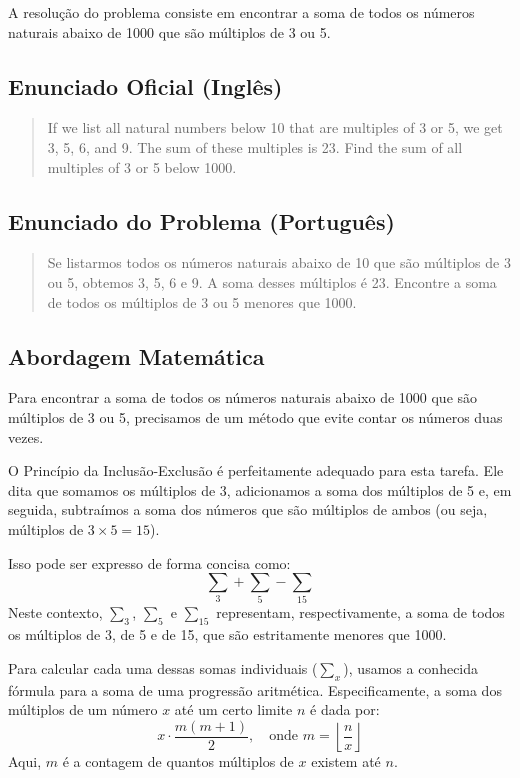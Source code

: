 
A resolução do problema consiste em encontrar a soma de todos os números naturais abaixo de 1000 que são múltiplos de 3 ou 5.

\subsection*{Enunciado Oficial (Inglês)}
\begin{quote}
If we list all natural numbers below 10 that are multiples of 3 or 5, we get 3, 5, 6, and 9. The sum of these multiples is 23.
Find the sum of all multiples of 3 or 5 below 1000.
\end{quote}

\subsection*{Enunciado do Problema (Português)}
\begin{quote}
Se listarmos todos os números naturais abaixo de 10 que são múltiplos de 3 ou 5, obtemos 3, 5, 6 e 9. A soma desses múltiplos é 23.
Encontre a soma de todos os múltiplos de 3 ou 5 menores que 1000.
\end{quote}



\subsection*{Abordagem Matemática}

Para encontrar a soma de todos os números naturais abaixo de 1000 que são múltiplos de 3 ou 5, precisamos de um método que evite contar os números duas vezes.

O Princípio da Inclusão-Exclusão é perfeitamente adequado para esta tarefa.
Ele dita que somamos os múltiplos de 3, adicionamos a soma dos múltiplos de 5 e, em seguida, subtraímos a soma dos números que são múltiplos de ambos (ou seja, múltiplos de $3 \times 5 = 15$).

Isso pode ser expresso de forma concisa como:
\[
\sum_3 + \sum_5 - \sum_{15}
\]
Neste contexto, $\sum_3$, $\sum_5$ e $\sum_{15}$ representam, respectivamente, a soma de todos os múltiplos de 3, de 5 e de 15, que são estritamente menores que 1000.

Para calcular cada uma dessas somas individuais ($\sum_x$), usamos a conhecida fórmula para a soma de uma progressão aritmética.
Especificamente, a soma dos múltiplos de um número $x$ até um certo limite $n$ é dada por:
\[
x \cdot \frac{m(m + 1)}{2}, \quad \text{onde } m = \left\lfloor \frac{n}{x} \right\rfloor
\]
Aqui, $m$ é a contagem de quantos múltiplos de $x$ existem até $n$.

